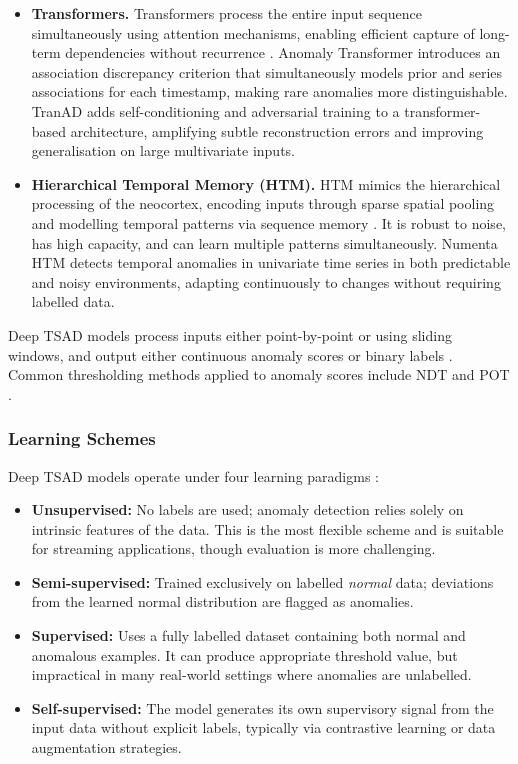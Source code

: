 \documentclass[twoside,11pt,openright]{report}
\begin{document}
\begin{itemize}
    \item \textbf{Transformers.} Transformers \citep{vaswani2017attention} process the entire input sequence simultaneously 
    using attention mechanisms, enabling efficient capture of long-term dependencies without 
    recurrence \citep{darban2024survey}. Anomaly Transformer \citep{anomalytransformer2022} 
    introduces an association discrepancy criterion that simultaneously models prior and 
    series associations for each timestamp, making rare anomalies more distinguishable. 
    TranAD \citep{tranad2022} adds self-conditioning and adversarial training to a 
    transformer-based architecture, amplifying subtle reconstruction errors and improving 
    generalisation on large multivariate inputs.

    \item \textbf{Hierarchical Temporal Memory (HTM).} HTM \citep{george2008brain} mimics the hierarchical 
    processing of the neocortex, encoding inputs through sparse spatial pooling and 
    modelling temporal patterns via sequence memory \citep{darban2024survey}. It is robust 
    to noise, has high capacity, and can learn multiple patterns simultaneously. Numenta HTM 
    \citep{ahmad2017unsupervised} detects temporal anomalies in univariate time series in 
    both predictable and noisy environments, adapting continuously to changes without 
    requiring labelled data.
\end{itemize}
 
Deep TSAD models process inputs either point-by-point or using sliding windows, and output either continuous anomaly scores or binary labels \citep{darban2024survey}.
Common thresholding methods applied to anomaly scores include NDT \citep{hundman2018smap} and POT \citep{siffer2017pot}.
 
\subsubsection{Learning Schemes}
 
Deep TSAD models operate under four learning paradigms \citep{darban2024survey}:
 
\begin{itemize}
    \item \textbf{Unsupervised:} No labels are used; anomaly detection relies solely on intrinsic features of the data. This is the most flexible scheme and is suitable for streaming applications, though evaluation is more challenging.
    \item \textbf{Semi-supervised:} Trained exclusively on labelled \textit{normal} data; deviations from the learned normal distribution are flagged as anomalies.
    \item \textbf{Supervised:} Uses a fully labelled dataset containing both normal and anomalous examples. It can produce appropriate threshold value, but impractical in many real-world settings where anomalies are unlabelled.
    \item \textbf{Self-supervised:} The model generates its own supervisory signal from the input data without explicit labels, typically via contrastive learning or data augmentation strategies.
\end{itemize}
 
\end{document}
